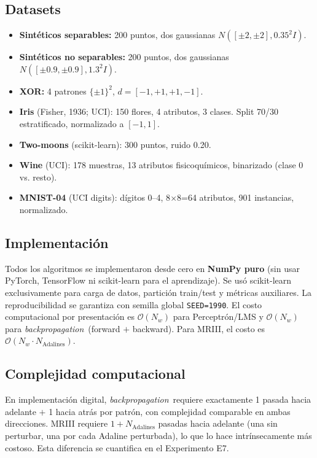 \documentclass[11pt,a4paper]{article}
\newcommand{\bp}{\textit{backpropagation}}
\begin{document}
\subsection{Datasets}

\begin{itemize}[leftmargin=*]
    \item \textbf{Sintéticos separables:} 200 puntos, dos gaussianas $N([\pm2,\pm2], 0.35^2I)$.
    \item \textbf{Sintéticos no separables:} 200 puntos, dos gaussianas $N([\pm0.9,\pm0.9], 1.3^2I)$.
    \item \textbf{XOR:} 4 patrones $\{\pm1\}^2$, $d = [-1, +1, +1, -1]$.
    \item \textbf{Iris} (Fisher, 1936; UCI): 150 flores, 4 atributos, 3 clases. Split 70/30 estratificado, normalizado a $[-1,1]$.
    \item \textbf{Two-moons} (scikit-learn): 300 puntos, ruido 0.20.
    \item \textbf{Wine} (UCI): 178 muestras, 13 atributos fisicoquímicos, binarizado (clase 0 vs. resto).
    \item \textbf{MNIST-04} (UCI digits): dígitos 0--4, 8$\times$8=64 atributos, 901 instancias, normalizado.
\end{itemize}

\subsection{Implementación}

Todos los algoritmos se implementaron desde cero en \textbf{NumPy puro} (sin usar PyTorch,
TensorFlow ni scikit-learn para el aprendizaje). Se usó scikit-learn exclusivamente para carga
de datos, partición train/test y métricas auxiliares. La reproducibilidad se garantiza con
semilla global \texttt{SEED=1990}. El costo computacional por presentación es $\mathcal{O}(N_w)$
para Perceptrón/LMS y $\mathcal{O}(N_w)$ para \bp~(forward $+$ backward). Para MRIII, el costo
es $\mathcal{O}(N_w \cdot N_{\text{Adalines}})$.

\subsection{Complejidad computacional}

En implementación digital, \bp~requiere exactamente 1 pasada hacia adelante $+$ 1 hacia atrás por
patrón, con complejidad comparable en ambas direcciones. MRIII requiere $1 + N_{\text{Adalines}}$
pasadas hacia adelante (una sin perturbar, una por cada Adaline perturbada), lo que lo hace
intrínsecamente más costoso. Esta diferencia se cuantifica en el Experimento E7.
\end{document}
